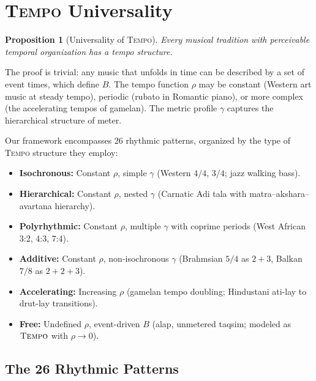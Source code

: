 \documentclass[cmj]{article}
\newtheorem{proposition}{Proposition}
\newcommand{\TEMPO}{\textsc{Tempo}}
\begin{document}
\section{\TEMPO{} Universality}
\label{sec:tempo}

\begin{proposition}[Universality of \TEMPO{}]
Every musical tradition with perceivable temporal organization has a tempo
structure.
\end{proposition}

The proof is trivial: any music that unfolds in time can be described by a set
of event times, which define $B$. The tempo function $\rho$ may be constant
(Western art music at steady tempo), periodic (rubato in Romantic piano),
or more complex (the accelerating tempos of gamelan). The metric profile
$\gamma$ captures the hierarchical structure of meter.

Our framework encompasses 26 rhythmic patterns, organized by the type of
\TEMPO{} structure they employ:

\begin{itemize}[nosep]
  \item \textbf{Isochronous:} Constant $\rho$, simple $\gamma$ (Western
    $4/4$, $3/4$; jazz walking bass).
  \item \textbf{Hierarchical:} Constant $\rho$, nested $\gamma$ (Carnatic
    Adi tala with matra--akshara--avartana hierarchy).
  \item \textbf{Polyrhythmic:} Constant $\rho$, multiple $\gamma$ with
    coprime periods (West African 3:2, 4:3, 7:4).
  \item \textbf{Additive:} Constant $\rho$, non-isochronous $\gamma$
    (Brahmsian $5/4$ as $2+3$, Balkan $7/8$ as $2+2+3$).
  \item \textbf{Accelerating:} Increasing $\rho$ (gamelan tempo doubling;
    Hindustani ati-lay to drut-lay transitions).
  \item \textbf{Free:} Undefined $\rho$, event-driven $B$ (alap, unmetered
    taqsim; modeled as $\TEMPO{}$ with $\rho \to 0$).
\end{itemize}

\subsection{The 26 Rhythmic Patterns}
\end{document}
